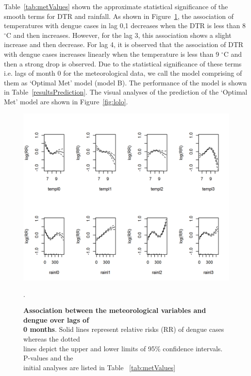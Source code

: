 \documentclass{bmcart}
\begin{document}
Table~\ref{tab:metValues} shown the approximate statistical significance of the smooth terms for DTR and rainfall. As shown in Figure~\ref{figure:D-M-1}, the association of temperatures with dengue cases in lag 0,1 decreases when the DTR is less than 8 $^{\circ}$C and then increases. However, for the lag 3, this association shows a slight increase and then decrease. For lag 4, it is observed that the association of DTR with dengue cases increases linearly when the temperature is less than 9 $^{\circ}$C  and then a strong drop is observed. Due to the statistical significance of these terms i.e. lags of month 0 for the meteorological data, we call the model comprising of them as `Optimal Met' model (model B). The performance of the model is shown in Table~\ref{resultsPrediction}. The visual analyses of the prediction of the `Optimal Met' model are shown in Figure~\ref{fig:lolo}. 

\begin{figure}[htbp]
	\begin{center}
		\includegraphics[width= 1.0\textwidth]{6-DM1}
		\caption{\textbf{Association between the meteorological variables and dengue over lags of \\ 0 months}. Solid lines represent relative risks (RR) of dengue cases whereas the dotted \\ lines depict the upper and lower limits of 95\%  confidence intervals. P-values and the \\ initial analyses are listed in Table ~\ref{tab:metValues}}
		\label{figure:D-M-1}.
	\end{center}
\end{figure}
\end{document}
